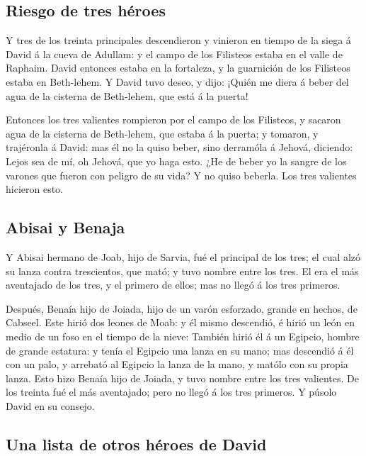 \hypertarget{riesgo-de-tres-huxe9roes}{%
\subsection{Riesgo de tres héroes}\label{riesgo-de-tres-huxe9roes}}

 Y tres de los treinta principales descendieron y
vinieron en tiempo de la siega á David á la cueva de Adullam: y el campo
de los Filisteos estaba en el valle de Raphaim.  David
entonces estaba en la fortaleza, y la guarnición de los Filisteos estaba
en Beth-lehem.  Y David tuvo deseo, y dijo: ¡Quién me
diera á beber del agua de la cisterna de Beth-lehem, que está á la
puerta!

 Entonces los tres valientes rompieron por el campo de
los Filisteos, y sacaron agua de la cisterna de Beth-lehem, que estaba á
la puerta; y tomaron, y trajéronla á David: mas él no la quiso beber,
sino derramóla á Jehová, diciendo:  Lejos sea de mí, oh
Jehová, que yo haga esto. ¿He de beber yo la sangre de los varones que
fueron con peligro de su vida? Y no quiso beberla. Los tres valientes
hicieron esto.

\hypertarget{abisai-y-benaja}{%
\subsection{Abisai y Benaja}\label{abisai-y-benaja}}

 Y Abisai hermano de Joab, hijo de Sarvia, fué el
principal de los tres; el cual alzó su lanza contra trescientos, que
mató; y tuvo nombre entre los tres.  El era el más
aventajado de los tres, y el primero de ellos; mas no llegó á los tres
primeros.

 Después, Benaía hijo de Joiada, hijo de un varón
esforzado, grande en hechos, de Cabseel. Este hirió dos leones de Moab:
y él mismo descendió, é hirió un león en medio de un foso en el tiempo
de la nieve:  También hirió él á un Egipcio, hombre de
grande estatura: y tenía el Egipcio una lanza en su mano; mas descendió
á él con un palo, y arrebató al Egipcio la lanza de la mano, y matólo
con su propia lanza.  Esto hizo Benaía hijo de Joiada, y
tuvo nombre entre los tres valientes.  De los treinta fué
el más aventajado; pero no llegó á los tres primeros. Y púsolo David en
su consejo.

\hypertarget{una-lista-de-otros-huxe9roes-de-david}{%
\subsection{Una lista de otros héroes de
David}\label{una-lista-de-otros-huxe9roes-de-david}}


